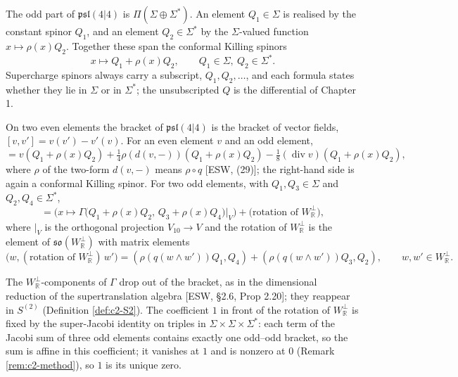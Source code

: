 \begin{definition}
\label{def:c2-odd}
The odd part of $\mathfrak{psl}(4|4)$ is $\Pi(\Sigma\oplus\Sigma^*)$. An element $Q_1\in\Sigma$ is realised by the constant spinor $Q_1$, and an element $Q_2\in\Sigma^*$ by the $\Sigma$-valued function $x\mapsto\rho(x)Q_2$. Together these span the conformal Killing spinors
\[
x\mapsto Q_1+\rho(x)Q_2,\qquad Q_1\in\Sigma,\ Q_2\in\Sigma^* .
\]
Supercharge spinors always carry a subscript, $Q_1,Q_2,\dots$, and each formula states whether they lie in $\Sigma$ or in $\Sigma^*$; the unsubscripted $Q$ is the differential of Chapter 1.
\end{definition}

\begin{definition}[Bracket]
\label{def:c2-bracket}
On two even elements the bracket of $\mathfrak{psl}(4|4)$ is the bracket of vector fields, $[v,v']=v(v')-v'(v)$. For an even element $v$ and an odd element,
\begin{equation}
[v,\,Q_1+\rho(x)Q_2]=v(Q_1+\rho(x)Q_2)+\tfrac14\rho(d(v,-))(Q_1+\rho(x)Q_2)-\tfrac18(\operatorname{div}v)(Q_1+\rho(x)Q_2),
\label{eq:c2-evenodd}
\end{equation}
where $\rho$ of the two-form $d(v,-)$ means $\rho\circ q$ [ESW, (29)]; the right-hand side is again a conformal Killing spinor. For two odd elements, with $Q_1,Q_3\in\Sigma$ and $Q_2,Q_4\in\Sigma^*$,
\begin{equation}
[Q_1+\rho(x)Q_2,\ Q_3+\rho(x)Q_4]=\Big(x\mapsto\Gamma\big(Q_1+\rho(x)Q_2,\,Q_3+\rho(x)Q_4\big)\big|_V\Big)+\big(\text{rotation of }W_{\mathbb R}^\perp\big),
\label{eq:c2-oddodd}
\end{equation}
where $|_V$ is the orthogonal projection $V_{10}\to V$ and the rotation of $W_{\mathbb R}^\perp$ is the element of $\mathfrak{so}(W_{\mathbb R}^\perp)$ with matrix elements
\[
\big(w,(\text{rotation of }W_{\mathbb R}^\perp)\,w'\big)=(\rho(q(w\wedge w'))Q_1,Q_4)+(\rho(q(w\wedge w'))Q_3,Q_2),\qquad w,w'\in W_{\mathbb R}^\perp .
\]
\end{definition}

The $W_{\mathbb R}^\perp$-components of $\Gamma$ drop out of the bracket, as in the dimensional reduction of the supertranslation algebra [ESW, §2.6, Prop 2.20]; they reappear in $S^{(2)}$ (Definition \ref{def:c2-S2}). The coefficient $1$ in front of the rotation of $W_{\mathbb R}^\perp$ is fixed by the super-Jacobi identity on triples in $\Sigma\times\Sigma\times\Sigma^*$: each term of the Jacobi sum of three odd elements contains exactly one odd--odd bracket, so the sum is affine in this coefficient; it vanishes at $1$ and is nonzero at $0$ (Remark \ref{rem:c2-method}), so $1$ is its unique zero.

